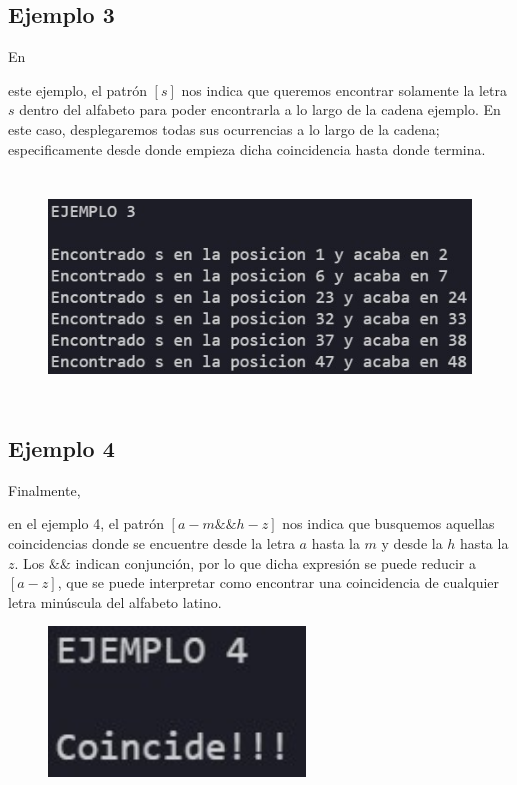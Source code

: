 \documentclass[stu, 12pt, letterpaper, donotrepeattitle, floatsintext, natbib]{apa7}
\begin{document}
\subsection{Ejemplo 3}
En  \begin{justifying}
    este ejemplo, el patrón \([s]\) nos indica que queremos encontrar solamente 
    la letra \(s\) dentro del alfabeto para poder encontrarla a lo largo de la cadena
    ejemplo. En este caso, desplegaremos todas sus ocurrencias a lo largo de la cadena;
    especificamente desde donde empieza dicha coincidencia hasta donde termina.\par
    \end{justifying}
    \begin{figure}[H]
        \centering
        \includegraphics[height=6cm]{ejemplo3.jpg}
    \end{figure}
\vspace{\baselineskip}
\subsection{Ejemplo 4}
Finalmente, \begin{justifying}
        en el ejemplo 4, el patrón \([a-m\&\&h-z]\) nos indica que busquemos
        aquellas coincidencias donde se encuentre desde la letra \(a\) hasta la \(m\)
        y desde la \(h\) hasta la \(z\). Los \(\&\&\) indican conjunción, por lo que
        dicha expresión se puede reducir a \([a-z]\), que se puede interpretar como 
        encontrar una coincidencia de cualquier letra minúscula del alfabeto latino.\par
    \end{justifying}
    \begin{figure}[H]
        \centering
        \includegraphics[height=4cm]{ejemplo4.jpg}
    \end{figure}
\end{document}

